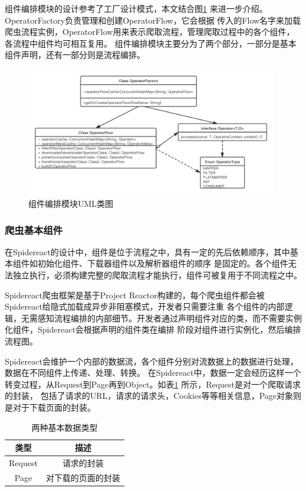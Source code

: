 \documentclass[master]{njuthesis}
\begin{document}
组件编排模块的设计参考了工厂设计模式，本文结合图\ref{fig:uml} 来进一步介绍。OperatorFactory负责管理和创建OperatorFlow，它会根据
传入的Flow名字来加载爬虫流程实例，OperatorFlow用来表示爬取流程，管理爬取过程中的各个组件，各流程中组件均可相互复用。
组件编排模块主要分为了两个部分，一部分是基本组件声明，还有一部分则是流程编排。

\begin{figure}
\centering
\includegraphics[width=0.98\textwidth]{pic/operatorflow.png}
\caption{组件编排模块UML类图}\label{fig:uml}
\end{figure}

\subsubsection{爬虫基本组件}
在Spidereact的设计中，组件是位于流程之中，具有一定的先后依赖顺序，其中基本组件如初始化组件、下载器组件以及解析器组件的顺序
是固定的。各个组件无法独立执行，必须构建完整的爬取流程才能执行，组件可被复用于不同流程之中。

Spidereact爬虫框架是基于Project Reactor构建的，每个爬虫组件都会被Spidereact给隐式加载成异步非阻塞模式，开发者只需要注重
各个组件的内部逻辑，无需感知流程编排的内部细节。开发者通过声明组件对应的类，而不需要实例化组件，Spidereact会根据声明的组件类在编排
阶段对组件进行实例化，然后编排流程图。

Spidereact会维护一个内部的数据流，各个组件分别对流数据上的数据进行处理，数据在不同组件上传递、处理、转换。
在Spidereact中，数据一定会经历这样一个转变过程，从Request到Page再到Object。如表\ref{table:object} 所示，Request是对一个爬取请求的封装，
包括了请求的URL，请求的请求头，Cookies等等相关信息，Page对象则是对于下载页面的封装。

\begin{table}
\centering
\begin{tabular}{|c|c|}
\hline
类型 & 描述 \\
\hline
Request &  请求的封装\\
Page & 对下载的页面的封装\\
\hline
\end{tabular}
\caption{两种基本数据类型}\label{table:object}
\end{table}
\end{document}
